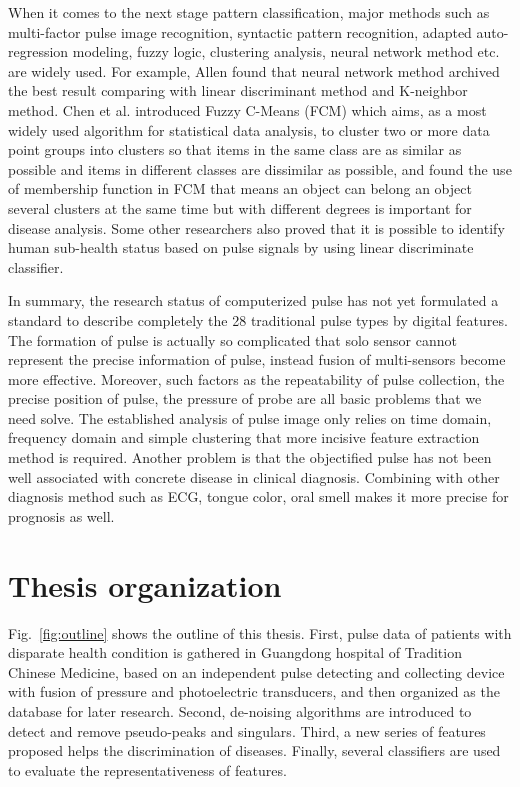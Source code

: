 When it comes to the next stage pattern classification, major methods
such as multi-factor pulse image recognition, syntactic pattern
recognition, adapted auto-regression modeling, fuzzy logic, clustering
analysis, neural network method etc. are widely used. For example,
Allen found that neural network method archived the best result
comparing with linear discriminant method and K-neighbor method. 
Chen et al.\cite{chen2009wrist} introduced Fuzzy C-Means (FCM) which aims, as a most
widely used algorithm for statistical data analysis, to cluster two or
more data point groups into clusters so that items in the same class
are as similar as possible and items in different classes are
dissimilar as possible, and found the use of membership function in
FCM that means an object can belong an object several clusters at the
same time but with different degrees is important for disease
analysis. Some other researchers\cite{zhang2005study,lu1999pulse} also proved that it is
possible to identify human sub-health status based on pulse signals by
using linear discriminate classifier. 

In summary, the research status of computerized pulse has not yet
formulated a standard to describe completely the 28 traditional pulse
types by digital features. The formation of pulse is actually so
complicated that solo sensor cannot represent the precise information
of pulse, instead fusion of multi-sensors become more effective.
Moreover, such factors as the repeatability of pulse collection, the
precise position of pulse, the pressure of probe are all basic
problems that we need solve. The established analysis of pulse image
only relies on time domain, frequency domain and simple clustering
that more incisive feature extraction method is required. Another
problem is that the objectified pulse has not been well associated
with concrete disease in clinical diagnosis. Combining with other
diagnosis method such as ECG, tongue color, oral smell makes it more
precise for prognosis as well. 

\section{Thesis organization}

Fig.~\ref{fig:outline} shows the outline of this thesis. First, pulse
data of patients with disparate health condition is gathered in
Guangdong hospital of Tradition Chinese Medicine, based
on an independent pulse detecting and collecting device with fusion of
pressure and photoelectric transducers, and then organized as the
database for later research. Second, de-noising algorithms are
introduced to detect and remove pseudo-peaks and singulars. Third, a
new series of features proposed helps the discrimination of diseases.
Finally, several classifiers are used to evaluate the
representativeness of features.

